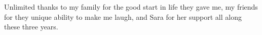 \begin{vcenterpage}
\noindent Unlimited thanks to my family for the good start in life they gave me, my friends for they unique ability to make me laugh, and Sara for her support all along these three years.\\


\end{vcenterpage}